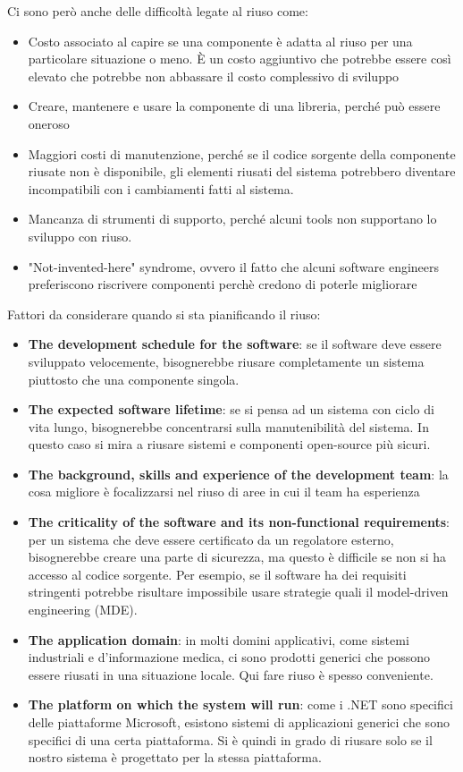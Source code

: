 			Ci sono però anche delle difficoltà legate al riuso come:
			\begin{itemize}
				\item Costo associato al capire se una componente è adatta al riuso per una particolare situazione o meno. È un costo aggiuntivo che potrebbe essere così elevato che potrebbe non abbassare il costo complessivo di sviluppo
				\item Creare, mantenere e usare la componente di una libreria, perché può essere oneroso
				\item Maggiori costi di manutenzione, perché se il codice sorgente della componente riusate non è disponibile, gli elementi riusati del sistema potrebbero diventare incompatibili con i cambiamenti fatti al sistema.
				\item Mancanza di strumenti di supporto, perché alcuni tools non supportano lo sviluppo con riuso.
				\item "Not-invented-here" syndrome, ovvero il fatto che alcuni software engineers preferiscono riscrivere componenti perchè credono di poterle migliorare
			\end{itemize}
			Fattori da considerare quando si sta pianificando il riuso:
			\begin{itemize}
				\item \textbf{The development schedule for the software}: se il software deve essere sviluppato velocemente, bisognerebbe riusare completamente un sistema piuttosto che una componente singola.
				\item \textbf{The expected software lifetime}: se si pensa ad un sistema con ciclo di vita lungo, bisognerebbe concentrarsi sulla manutenibilità del sistema. In questo caso si mira a riusare sistemi e componenti open-source più sicuri.
				\item \textbf{The background, skills and experience of the development team}: la cosa migliore è focalizzarsi nel riuso di aree in cui il team ha esperienza
				\item \textbf{The criticality of the software and its non-functional requirements}: per un sistema che deve essere certificato da un regolatore esterno, bisognerebbe creare una parte di sicurezza, ma questo è difficile se non si ha accesso al codice sorgente. Per esempio, se il software ha dei requisiti stringenti potrebbe risultare impossibile usare strategie quali il model-driven engineering (MDE).
				\item \textbf{The application domain}: in molti domini applicativi, come sistemi industriali e d'informazione medica, ci sono prodotti generici che possono essere riusati in una situazione locale. Qui fare riuso è spesso conveniente.
				\item \textbf{The platform on which the system will run}: come i .NET sono specifici delle piattaforme Microsoft, esistono sistemi di applicazioni generici che sono specifici di una certa piattaforma. Si è quindi in grado di riusare solo se il nostro sistema è progettato per la stessa piattaforma.
			\end{itemize}

